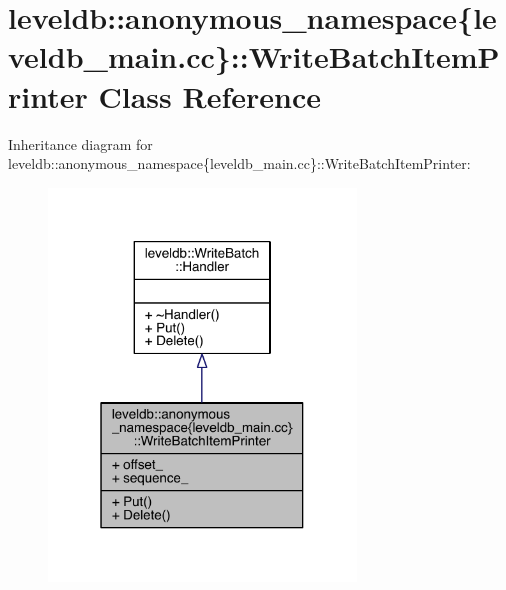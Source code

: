 \hypertarget{classleveldb_1_1anonymous__namespace_02leveldb__main_8cc_03_1_1_write_batch_item_printer}{}\section{leveldb\+:\+:anonymous\+\_\+namespace\{leveldb\+\_\+main.\+cc\}\+:\+:Write\+Batch\+Item\+Printer Class Reference}
\label{classleveldb_1_1anonymous__namespace_02leveldb__main_8cc_03_1_1_write_batch_item_printer}


Inheritance diagram for leveldb\+:\+:anonymous\+\_\+namespace\{leveldb\+\_\+main.\+cc\}\+:\+:Write\+Batch\+Item\+Printer\+:
\nopagebreak
\begin{figure}[H]
\begin{center}
\leavevmode
\includegraphics[width=232pt]{classleveldb_1_1anonymous__namespace_02leveldb__main_8cc_03_1_1_write_batch_item_printer__inherit__graph}
\end{center}
\end{figure}


